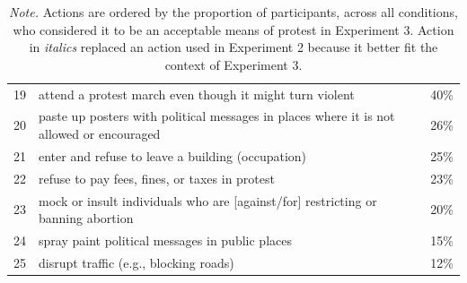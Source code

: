 \documentclass[12pt, letterpaper]{article}
\begin{document}
\begin{table}
\begin{tabularx}{\linewidth}{rXr}
19 & attend a protest march even though it might turn violent & 40\%\\
20 & paste up posters with political messages in places where it is not allowed or encouraged & 26\%\\
21 & enter and refuse to leave a building (occupation) & 25\%\\
22 & refuse to pay fees, fines, or taxes in protest & 23\%\\
23 & mock or insult individuals who are [against/for] restricting or banning abortion & 20\%\\
24 & spray paint political messages in public places & 15\%\\
25 & disrupt traffic (e.g., blocking roads) & 12\%\\
\bottomrule
\end{tabularx}
\caption*{\textit{Note.} Actions are ordered by the proportion of participants, across all conditions, who considered it to be an acceptable means of protest in Experiment 3. Action in \textit{italics} replaced an action used in Experiment 2 because it better fit the context of Experiment 3.}

\end{table}
\end{document}
